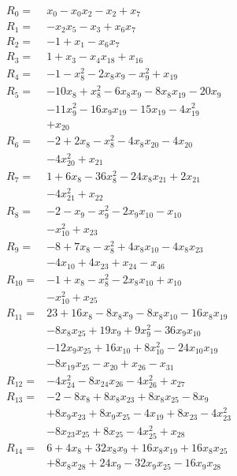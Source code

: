 \allowdisplaybreaks[4]
\begin{align*}
R_{0}={}&x_{0} -x_{0}x_{2} -x_{2} +x_{7}\\[3pt]
R_{1}={}&-x_{2}x_{5} -x_{3} +x_{6}x_{7}\\[3pt]
R_{2}={}&-1 +x_{1} -x_{6}x_{7}\\[3pt]
R_{3}={}&1 +x_{3} -x_{4}x_{18} +x_{16}\\[3pt]
R_{4}={}&-1 -x_{8}^{2} -2x_{8}x_{9} -x_{9}^{2} +x_{19}\\[3pt]
R_{5}={}&-10x_{8} +x_{8}^{2} -6x_{8}x_{9} -8x_{8}x_{19} -20x_{9}\\
&-11x_{9}^{2} -16x_{9}x_{19} -15x_{19} -4x_{19}^{2}\\
&+x_{20}\\[3pt]
R_{6}={}&-2 +2x_{8} -x_{8}^{2} -4x_{8}x_{20} -4x_{20}\\
&-4x_{20}^{2} +x_{21}\\[3pt]
R_{7}={}&1 +6x_{8} -36x_{8}^{2} -24x_{8}x_{21} +2x_{21}\\
&-4x_{21}^{2} +x_{22}\\[3pt]
R_{8}={}&-2 -x_{9} -x_{9}^{2} -2x_{9}x_{10} -x_{10}\\
&-x_{10}^{2} +x_{23}\\[3pt]
R_{9}={}&-8 +7x_{8} -x_{8}^{2} +4x_{8}x_{10} -4x_{8}x_{23}\\
&-4x_{10} +4x_{23} +x_{24} -x_{46}\\[3pt]
R_{10}={}&-1 +x_{8} -x_{8}^{2} -2x_{8}x_{10} +x_{10}\\
&-x_{10}^{2} +x_{25}\\[3pt]
R_{11}={}&23 +16x_{8} -8x_{8}x_{9} -8x_{8}x_{10} -16x_{8}x_{19}\\
&-8x_{8}x_{25} +19x_{9} +9x_{9}^{2} -36x_{9}x_{10}\\
&-12x_{9}x_{25} +16x_{10} +8x_{10}^{2} -24x_{10}x_{19}\\
&-8x_{19}x_{25} -x_{20} +x_{26} -x_{31}\\[3pt]
R_{12}={}&-4x_{24}^{2} -8x_{24}x_{26} -4x_{26}^{2} +x_{27}\\[3pt]
R_{13}={}&-2 -8x_{8} +8x_{8}x_{23} +8x_{8}x_{25} -8x_{9}\\
&+8x_{9}x_{23} +8x_{9}x_{25} -4x_{19} +8x_{23} -4x_{23}^{2}\\
&-8x_{23}x_{25} +8x_{25} -4x_{25}^{2} +x_{28}\\[3pt]
R_{14}={}&6 +4x_{8} +32x_{8}x_{9} +16x_{8}x_{19} +16x_{8}x_{25}\\
&+8x_{8}x_{28} +24x_{9} -32x_{9}x_{25} -16x_{9}x_{28}\\

\end{align*}
